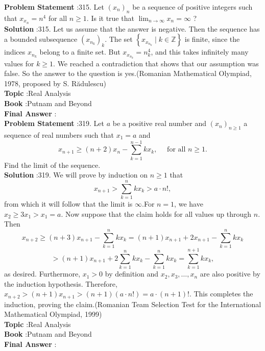\documentclass[10pt]{article}
\begin{document}
\textbf{Problem Statement} :315. Let $\left(x_{n}\right)_{n}$ be a sequence of positive integers such that $x_{x_{n}}=n^{4}$ for all $n \geq 1$. Is it true that $\lim _{n \rightarrow \infty} x_{n}=\infty$ ? \\
\textbf{Solution} :315. Let us assume that the answer is negative. Then the sequence has a bounded subsequence $\left(x_{n_{k}}\right)_{k}$. The set $\left\{x_{x_{n_{k}}} \mid k \in \mathbb{Z}\right\}$ is finite, since the indices $x_{n_{k}}$ belong to a finite set. But $x_{x_{n_{k}}}=n_{k}^{4}$, and this takes infinitely many values for $k \geq 1$. We reached a contradiction that shows that our assumption was false. So the answer to the question is yes.(Romanian Mathematical Olympiad, 1978, proposed by S. Rădulescu)\\
\textbf{Topic} :Real Analysis\\
\textbf{Book} :Putnam and Beyond\\
\textbf{Final Answer} :\\


\textbf{Problem Statement} :319. Let $a$ be a positive real number and $\left(x_{n}\right)_{n \geq 1}$ a sequence of real numbers such that $x_{1}=a$ and$$ x_{n+1} \geq(n+2) x_{n}-\sum_{k=1}^{n-1} k x_{k}, \quad \text { for all } n \geq 1 . $$Find the limit of the sequence.\\
\textbf{Solution} :319. We will prove by induction on $n \geq 1$ that$$ x_{n+1}>\sum_{k=1}^{n} k x_{k}>a \cdot n !, $$from which it will follow that the limit is $\infty$.For $n=1$, we have $x_{2} \geq 3 x_{1}>x_{1}=a$. Now suppose that the claim holds for all values up through $n$. Then$$ x_{n+2} \geq(n+3) x_{n+1}-\sum_{k=1}^{n} k x_{k}=(n+1) x_{n+1}+2 x_{n+1}-\sum_{k=1}^{n} k x_{k} $$$$ >(n+1) x_{n+1}+2 \sum_{k=1}^{n} k x_{k}-\sum_{k=1}^{n} k x_{k}=\sum_{k=1}^{n+1} k x_{k}, $$as desired. Furthermore, $x_{1}>0$ by definition and $x_{2}, x_{3}, \ldots, x_{n}$ are also positive by the induction hypothesis. Therefore, $x_{n+2}>(n+1) x_{n+1}>(n+1)(a \cdot n !)=a \cdot(n+1) !$. This completes the induction, proving the claim.(Romanian Team Selection Test for the International Mathematical Olympiad, 1999) \\
\textbf{Topic} :Real Analysis\\
\textbf{Book} :Putnam and Beyond\\
\textbf{Final Answer} :\\
\end{document}
